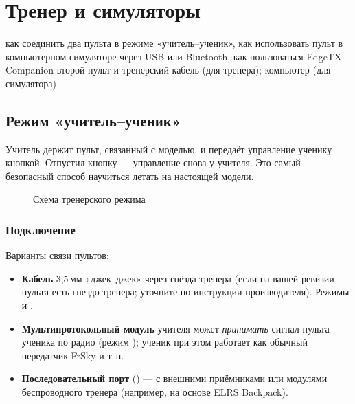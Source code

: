 \chapter{Тренер и симуляторы}
\label{ch:trainer}
\chapterintro
  {как соединить два пульта в режиме «учитель--ученик», как использовать пульт
   в компьютерном симуляторе через USB или Bluetooth, как пользоваться EdgeTX Companion}
  {второй пульт и тренерский кабель (для тренера); компьютер (для симулятора)}

\section{Режим «учитель--ученик»}

Учитель держит пульт, связанный с моделью, и передаёт управление ученику кнопкой.
Отпустил кнопку --- управление снова у учителя. Это самый безопасный способ научиться летать
на настоящей модели.

\begin{figure}[H]
\centering
{}
\caption{Схема тренерского режима}
\end{figure}

\subsection{Подключение}

Варианты связи пультов:
\begin{itemize}
  \item \textbf{Кабель} 3,5\,мм «джек--джек» через гнёзда тренера (если на вашей ревизии
        пульта есть гнездо тренера; уточните по инструкции производителя).
        Режимы  и .
  \item \textbf{Мультипротокольный модуль} учителя может \emph{принимать} сигнал пульта ученика
        по радио (режим ); ученик при этом работает как обычный передатчик
        FrSky и т.\,п.
  \item \textbf{Последовательный порт} () --- с внешними приёмниками
        или модулями беспроводного тренера (например, на основе ELRS Backpack).
\end{itemize}

